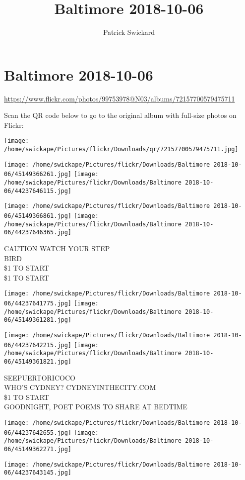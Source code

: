 \documentclass[10pt,letterpaper]{article}
\title{Baltimore 2018-10-06}
\author{Patrick Swickard}
\date{}
\begin{document}
\section*{Baltimore 2018-10-06}

\url{https://www.flickr.com/photos/99753978@N03/albums/72157700579475711}

Scan the QR code below to go to the original album with full-size photos on Flickr:

\texttt{[image: /home/swickape/Pictures/flickr/Downloads/qr/72157700579475711.jpg]}
\pagebreak

\texttt{[image: /home/swickape/Pictures/flickr/Downloads/Baltimore 2018-10-06/45149366261.jpg]}
\texttt{[image: /home/swickape/Pictures/flickr/Downloads/Baltimore 2018-10-06/44237646115.jpg]}

\texttt{[image: /home/swickape/Pictures/flickr/Downloads/Baltimore 2018-10-06/45149366861.jpg]}
\texttt{[image: /home/swickape/Pictures/flickr/Downloads/Baltimore 2018-10-06/44237646365.jpg]}

CAUTION WATCH YOUR STEP\\
BIRD\\
\$1 TO START\\
\$1 TO START
\pagebreak

\texttt{[image: /home/swickape/Pictures/flickr/Downloads/Baltimore 2018-10-06/44237641775.jpg]}
\texttt{[image: /home/swickape/Pictures/flickr/Downloads/Baltimore 2018-10-06/45149361281.jpg]}

\texttt{[image: /home/swickape/Pictures/flickr/Downloads/Baltimore 2018-10-06/44237642215.jpg]}
\texttt{[image: /home/swickape/Pictures/flickr/Downloads/Baltimore 2018-10-06/45149361821.jpg]}

SEEPUERTORICOCO\\
WHO'S CYDNEY?  CYDNEYINTHECITY.COM\\
\$1 TO START\\
GOODNIGHT, POET POEMS TO SHARE AT BEDTIME
\pagebreak

\texttt{[image: /home/swickape/Pictures/flickr/Downloads/Baltimore 2018-10-06/44237642655.jpg]}
\texttt{[image: /home/swickape/Pictures/flickr/Downloads/Baltimore 2018-10-06/45149362271.jpg]}

\texttt{[image: /home/swickape/Pictures/flickr/Downloads/Baltimore 2018-10-06/44237643145.jpg]}
\end{document}
